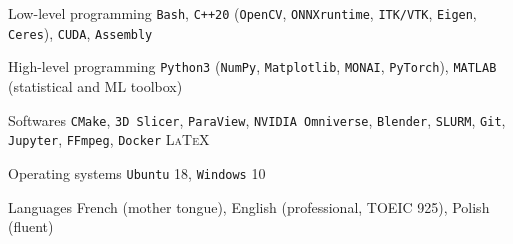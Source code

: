 


\begin{cvskills}


\cvskill
{Low-level programming} %
{\texttt{Bash}, \texttt{C++20} (\texttt{OpenCV}, \texttt{ONNXruntime},  \texttt{ITK/VTK}, \texttt{Eigen}, \texttt{Ceres}), \texttt{CUDA}, \texttt{Assembly}} %


\cvskill
{High-level programming} %
{\texttt{Python3} (\texttt{NumPy}, \texttt{Matplotlib}, \texttt{MONAI}, \texttt{PyTorch}), \texttt{MATLAB} (statistical and ML toolbox)} %


\cvskill
{Softwares} %
{\texttt{CMake}, \texttt{3D Slicer}, \texttt{ParaView}, \texttt{NVIDIA Omniverse}, \texttt{Blender}, \texttt{SLURM}, \texttt{Git}, \texttt{Jupyter},  \texttt{FFmpeg}, \texttt{Docker} \textsc{\LaTeX}} %


\cvskill
{Operating systems} %
{\texttt{Ubuntu} 18, \texttt{Windows} 10} %


\cvskill
{Languages} %
{French (mother tongue), English (professional, TOEIC 925), Polish (fluent)} %


\end{cvskills}
